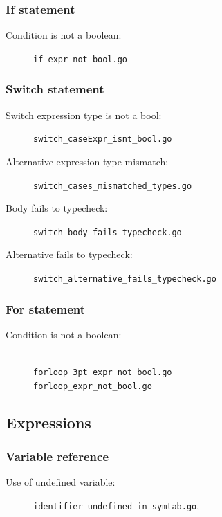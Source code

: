 \documentclass[oneside]{article}
\begin{document}
\subsubsection{If statement}
\begin{description}
  \item[Condition is not a boolean:] \verb|if_expr_not_bool.go|
\end{description}

\subsubsection{Switch statement}
\begin{description}
  \item[Switch expression type is not a bool:] \verb|switch_caseExpr_isnt_bool.go|
  \item[Alternative expression type mismatch:] \verb|switch_cases_mismatched_types.go|
  \item[Body fails to typecheck:] \verb|switch_body_fails_typecheck.go|
  \item[Alternative fails to typecheck:] \verb|switch_alternative_fails_typecheck.go|
\end{description}

\subsubsection{For statement}

\begin{description}
  \item[Condition is not a boolean:] \ \\
    \verb|forloop_3pt_expr_not_bool.go| \\
    \verb|forloop_expr_not_bool.go|
\end{description}


\subsection{Expressions}

\subsubsection{Variable reference}
\begin{description}
  \item[Use of undefined variable:] \verb|identifier_undefined_in_symtab.go|,
\end{description}
\end{document}
